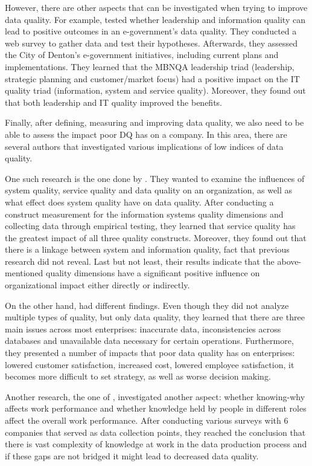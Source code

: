 \documentclass{mprop}
\begin{document}
However, there are other aspects that can be investigated when trying to improve
data quality. For example, \citet{prybutok2008evaluating} tested whether  
leadership and information quality can lead to positive outcomes in an 
e-government's data quality. They conducted a web survey to gather data and test 
their hypotheses. Afterwards, they assessed the City of Denton's e-government 
initiatives, including current plans and implementations. They learned that the 
MBNQA leadership triad (leadership, strategic planning and customer/market focus) 
had a positive impact on the IT quality triad (information, system and service 
quality). Moreover, they found out that both leadership and IT quality improved 
the benefits.

Finally, after defining, measuring and improving data quality, we also need
to be able to assess the impact poor DQ has on a company. In this area, there
are several authors that investigated various implications of low indices
of data quality.

One such research is the one done by \citet{gorla2010organizational}. They wanted
to examine the influences of system quality, service quality and data quality
on an organization, as well as what effect does system quality have on
data quality. After conducting a construct measurement for the information
systems quality dimensions \citep{swanson1997maintaining} and collecting data
through empirical testing, they learned that service quality has the greatest
impact of all three quality constructs. Moreover, they found out that there is 
a linkage between system and information quality, fact that previous research
did not reveal. Last but not least, their results indicate that the 
above-mentioned quality dimensions have a significant positive influence on 
organizational impact either directly or indirectly. 

On the other hand, \citet{redman1998impact} had different findings. Even though
they did not analyze multiple types of quality, but only data quality, they 
learned that there are three main issues across most enterprises: inaccurate
data, inconsistencies across databases and unavailable data necessary for 
certain operations. Furthermore, they presented a number of impacts that
poor data quality has on enterprises: lowered customer satisfaction, increased
cost, lowered employee satisfaction, it becomes more difficult to set strategy,
as well as worse decision making.

Another research, the one of \citet{lee2003knowing}, investigated another 
aspect: whether knowing-why affects work performance and whether knowledge held
by people in different roles affect the overall work performance. After
conducting various surveys with 6 companies that served as data collection 
points, they reached the conclusion that there is vast complexity of 
knowledge at work in the data production process and if these gaps are not 
bridged it might lead to decreased data quality.
\end{document}
